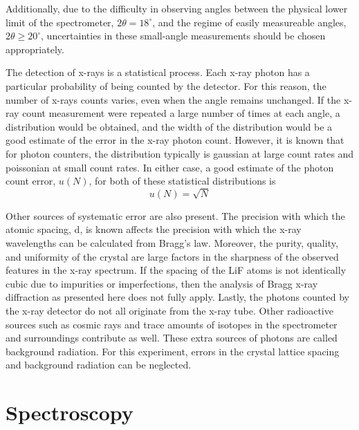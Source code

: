 \noindent Additionally, due to the difficulty in observing angles between the physical lower limit of the spectrometer, $2\theta=18^{\circ}$, and the regime of easily measureable angles, $2\theta \geq 20^{\circ}$, uncertainties in these small-angle measurements should be chosen appropriately.


\noindent The detection of x-rays is a statistical process.  Each x-ray photon has a particular probability of being counted by the detector. For this reason, the number of x-rays counts varies, even when the angle remains unchanged. If the x-ray count measurement were repeated a large number of times at each angle, a distribution would be obtained, and the width of the distribution would be a good estimate of the error in the x-ray photon count. However, it is known that for photon counters, the distribution typically is gaussian at large count rates and poissonian at small count rates. In either case, a good estimate of the photon count error, $u(N)$, for both of these statistical distributions is \begin{equation}\label{eq:XR8}
    u(N) = \sqrt{N}
\end{equation}

\noindent Other sources of systematic error are also present. The precision with which the atomic spacing, d, is known affects the precision with which the x-ray wavelengths can be calculated from Bragg’s law. Moreover, the purity, quality, and uniformity of the crystal are large factors in the sharpness of the observed features in the x-ray spectrum. If the spacing of the LiF atoms is not identically cubic due to impurities or imperfections, then the analysis of Bragg x-ray diffraction as presented here does not fully apply. Lastly, the photons counted by the x-ray detector do not all originate from the x-ray tube. Other radioactive sources such as cosmic rays and trace amounts of isotopes in the spectrometer and surroundings contribute as well. These extra sources of photons are called background radiation. For this experiment, errors in the crystal lattice spacing and background radiation can be neglected.


\chapter{Spectroscopy}


